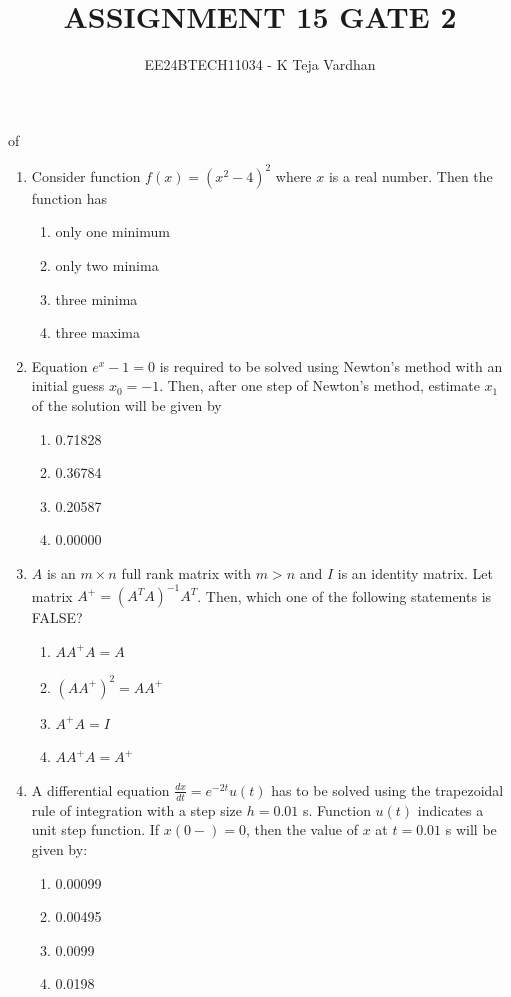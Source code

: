 \documentclass{article}
\begin{document}

\title{ASSIGNMENT 15 GATE 2}of
\author{EE24BTECH11034 - K Teja Vardhan}
{\let\newpage\relax\maketitle}




    \begin{enumerate}
    \item Consider function $f(x) = (x^2 - 4)^2$ where $x$ is a real number. Then the function has 
        \begin{enumerate}
            \item only one minimum
            \item only two minima
            \item three minima
            \item three maxima
        \end{enumerate}

    \item Equation $e^x - 1 = 0$ is required to be solved using Newton's method with an initial guess $x_0 = -1$. Then, after one step of Newton's method, estimate $x_1$ of the solution will be given by  

        \begin{enumerate}
            \item 0.71828
            \item 0.36784
            \item 0.20587
            \item 0.00000
        \end{enumerate}

    \item $A$ is an $m \times n$ full rank matrix with $m > n$ and $I$ is an identity matrix. Let matrix $A^+ = (A^T A)^{-1} A^T$. Then, which one of the following statements is FALSE?
        \begin{enumerate}
            \item $AA^+A = A$
            \item $(AA^+)^2 = AA^+$
            \item $A^+A = I$
            \item $AA^+A = A^+$
        \end{enumerate}

    \item A differential equation $\frac{dx}{dt} = e^{-2t}u(t)$ has to be solved using the trapezoidal rule of integration with a step size $h = 0.01$ s. Function $u(t)$ indicates a unit step function. If $x(0-) = 0$, then the value of $x$ at $t = 0.01$ s will be given by:
        \begin{enumerate}
            \item 0.00099
            \item 0.00495
            \item 0.0099
            \item 0.0198
        \end{enumerate}


\end{enumerate}
\end{document}
